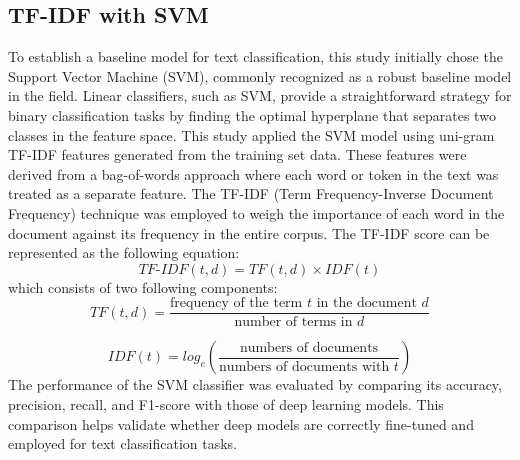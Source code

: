 \subsection{TF-IDF with SVM}
To establish a baseline model for text classification, this study initially chose the Support Vector Machine (SVM)\cite{b17}, commonly recognized as a robust baseline model in the field. 
Linear classifiers, such as SVM, provide a straightforward strategy for binary classification tasks by finding the optimal hyperplane that separates two classes in the feature space. 
This study applied the SVM model using uni-gram TF-IDF features generated from the training set data. These features were derived from a bag-of-words approach where each word or token in the text was treated as a separate feature. The TF-IDF (Term Frequency-Inverse Document Frequency) technique was employed to weigh the importance of each word in the document against its frequency in the entire corpus. The TF-IDF score can be represented as the following equation:
\begin{equation}
    TF\text{-}IDF(t,d)=TF(t,d)×IDF(t)
\end{equation}
which consists of two following components:
\begin{equation}
    TF(t,d) = \frac{\text{frequency of the term }\displaystyle t \text{ in the document } \displaystyle d }{\text{number of terms in } \displaystyle d} 
\end{equation}

\begin{equation}
    IDF(t) = log_{e}\left(  \frac{\text{numbers of documents}}{\text{numbers of documents with }t}\right)
\end{equation}
The performance of the SVM classifier was evaluated by comparing its accuracy, precision, recall, and F1-score with those of deep learning models. This comparison helps validate whether deep models are correctly fine-tuned and employed for text classification tasks\cite{b18}.
